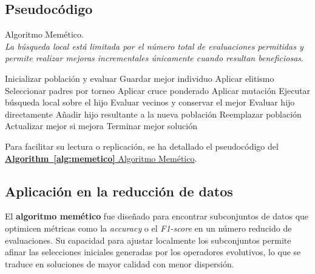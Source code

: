 \subsection{Pseudocódigo}\label{subsec:Pseudocodigo-memetico}
\begin{algorithm}[htp]
      \caption[Algoritmo Memético]{Algoritmo Memético.\\ [2pt]
      \small \textit{La búsqueda local está limitada por el número total de evaluaciones permitidas y permite realizar mejoras incrementales únicamente cuando resultan beneficiosas}.}
      \label{alg:memetico}
      \begin{algorithmic}[1]
            \State Inicializar población y evaluar
            \State Guardar mejor individuo
            \State Aplicar elitismo
            \State Seleccionar padres por torneo
            \State Aplicar cruce ponderado
            \State Aplicar mutación
            \State Ejecutar búsqueda local sobre el hijo
            \State Evaluar vecinos y conservar el mejor
            \Else
            \State Evaluar hijo directamente
            \EndIf
            \State Añadir hijo resultante a la nueva población
            \EndWhile
            \State Reemplazar población
            \State Actualizar mejor si mejora
            \State Terminar
            \EndIf
            \EndWhile
            \State \Return mejor solución
      \end{algorithmic}
\end{algorithm}

Para facilitar su lectura o replicación, se ha detallado el pseudocódigo del \hyperref[alg:memetico]{\textbf{Algorithm~\ref*{alg:memetico}} Algoritmo Memético}.

\subsection{Aplicación en la reducción de datos}\label{subsec:aplicacion-en-la-reduccion-de-datos-memetico}
El \textbf{algoritmo memético} fue diseñado para encontrar subconjuntos de datos que optimicen métricas
como la \textit{accuracy} o el \textit{F1-score} en un número reducido de evaluaciones.
Su capacidad para ajustar localmente los subconjuntos permite afinar las selecciones iniciales generadas
por los operadores evolutivos, lo que se traduce en soluciones de mayor calidad con menor dispersión.

